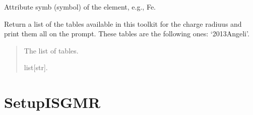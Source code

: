 \documentclass[letterpaper,10pt,english]{sphinxmanual}
\begin{document}
\begin{fulllineitems}

\begin{fulllineitems}
\label{\detokenize{source/api/setup_rad_ch:nucleardatapy.setup_rad_ch.SetupRadCh.symb}}
\pysigstartsignatures
{}
\pysigstopsignatures
\sphinxAtStartPar
Attribute symb (symbol) of the element, e.g., Fe.

\end{fulllineitems}


\end{fulllineitems}


\begin{fulllineitems}
\label{\detokenize{source/api/setup_rad_ch:nucleardatapy.setup_rad_ch.tables_rad_ch}}
\pysigstartsignatures
{}
\pysigstopsignatures
\sphinxAtStartPar
Return a list of the tables available in this toolkit for the charge radiuus and
print them all on the prompt.  These tables are the following
ones: ‘2013\sphinxhyphen{}Angeli’.
\begin{quote}\begin{description}
\sphinxAtStartPar
The list of tables.

\sphinxAtStartPar
list{[}str{]}.

\end{description}\end{quote}

\end{fulllineitems}


\sphinxstepscope


\section{SetupISGMR}
\label{\detokenize{source/api/setup_ISGMR:setupisgmr}}\label{\detokenize{source/api/setup_ISGMR::doc}}\label{\detokenize{source/api/setup_ISGMR:module-nucleardatapy.setup_ISGMR}}
\end{document}
